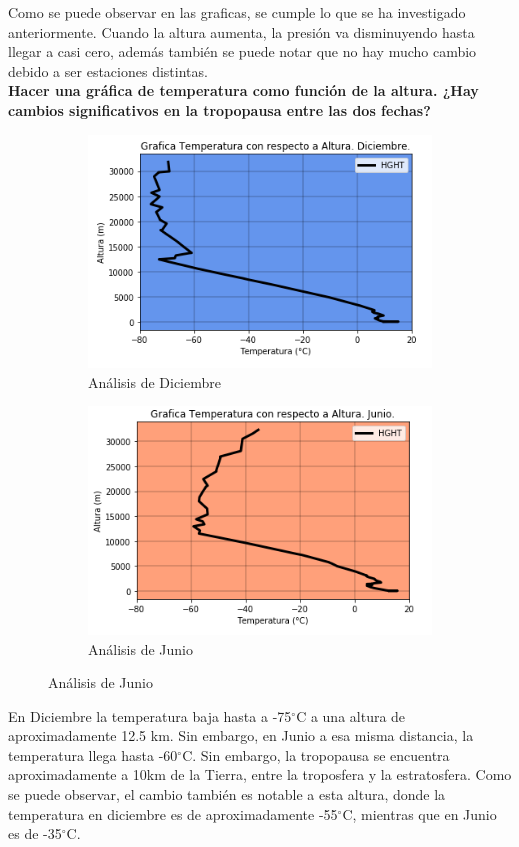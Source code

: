 \documentclass[12pt]{article}
\begin{document}
Como se puede observar en las graficas,  se cumple lo que se ha investigado anteriormente. Cuando la altura aumenta, la presión va disminuyendo hasta llegar a casi cero, además también se puede notar que no hay mucho cambio debido a ser estaciones distintas. \\

\noindent\textbf{Hacer una gráfica de temperatura como función de la altura. ¿Hay cambios significativos en la tropopausa entre las dos fechas?} 

\begin{figure}[h!]
\begin{subfigure}{.55\textwidth}
  \centering
  \includegraphics[width=.8\linewidth]{GrafATDec.png}
  \caption{Análisis de Diciembre}
  \label{fig:sfig1}
\end{subfigure}
\begin{subfigure}{.55\textwidth}
  \centering
  \includegraphics[width=.8\linewidth]{GrafATJun.png}
  \caption{Análisis de Junio}
  \label{fig:sfig2}
\end{subfigure}
\end{figure}

En Diciembre la temperatura baja hasta a -75$^{\circ}$C a una altura de aproximadamente 12.5 km. Sin embargo, en Junio a esa misma distancia, la temperatura llega hasta -60$^{\circ}$C. Sin embargo, la tropopausa se encuentra aproximadamente a 10km de la Tierra, entre la troposfera y la estratosfera. Como se puede observar, el cambio también es notable a esta altura, donde la temperatura en diciembre es de aproximadamente -55$^{\circ}$C, mientras que en Junio es de -35$^{\circ}$C. \\
\end{document}
